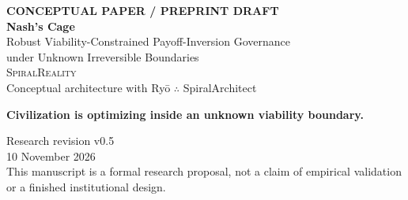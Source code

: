 \documentclass[11pt,a4paper]{article}
\numberwithin{equation}{section}
\theoremstyle{definition}
\theoremstyle{plain}
\theoremstyle{remark}
\begin{document}
\hypersetup{pageanchor=false}
\begin{titlepage}
\thispagestyle{empty}
\centering
\vspace*{1.6cm}
{\small\bfseries\color{Moss}\MakeUppercase{Conceptual Paper / Preprint Draft}}\\[1.1cm]
{\fontsize{31}{36}\selectfont\bfseries\color{Forest} Nash's Cage}\\[0.55cm]
{\fontsize{17}{22}\selectfont\color{Earth}
Robust Viability-Constrained Payoff-Inversion Governance\\
under Unknown Irreversible Boundaries}\\[1.6cm]

{\Large\textsc{SpiralReality}}\\[0.35cm]
{\large Conceptual architecture with Ry\={o} $\therefore$ SpiralArchitect}\\[1.5cm]

\begin{tcolorbox}[width=0.84\textwidth,colback=Mist,colframe=Forest,boxrule=0.8pt]
\centering\large\bfseries
Civilization is optimizing inside an unknown viability boundary.
\end{tcolorbox}

\vfill
{\large Research revision v0.5}\\[0.2cm]
{\large 10 November 2026}\\[1cm]
{\small This manuscript is a formal research proposal, not a claim of empirical validation or a finished institutional design.}
\end{titlepage}
\hypersetup{pageanchor=true}
\setcounter{page}{1}
\end{document}
